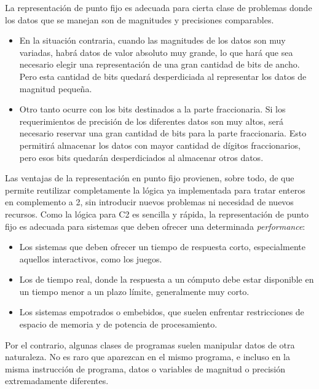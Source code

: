 \documentclass[spanish,A4,]{article}
\begin{document}
La representación de punto fijo es adecuada para cierta clase de
problemas donde los datos que se manejan son de magnitudes y precisiones
comparables.

\begin{itemize}
\itemsep1pt\parskip0pt
\item
  En la situación contraria, cuando las magnitudes de los datos son muy
  variadas, habrá datos de valor absoluto muy grande, lo que hará que
  sea necesario elegir una representación de una gran cantidad de bits
  de ancho. Pero esta cantidad de bits quedará desperdiciada al
  representar los datos de magnitud pequeña.\\
\item
  Otro tanto ocurre con los bits destinados a la parte fraccionaria. Si
  los requerimientos de precisión de los diferentes datos son muy altos,
  será necesario reservar una gran cantidad de bits para la parte
  fraccionaria. Esto permitirá almacenar los datos con mayor cantidad de
  dígitos fraccionarios, pero esos bits quedarán desperdiciados al
  almacenar otros datos.
\end{itemize}

Las ventajas de la representación en punto fijo provienen, sobre todo,
de que permite reutilizar completamente la lógica ya implementada para
tratar enteros en complemento a 2, sin introducir nuevos problemas ni
necesidad de nuevos recursos. Como la lógica para C2 es sencilla y
rápida, la representación de punto fijo es adecuada para sistemas que
deben ofrecer una determinada \emph{performance}:

\begin{itemize}
\itemsep1pt\parskip0pt
\item
  Los sistemas que deben ofrecer un tiempo de respuesta corto,
  especialmente aquellos interactivos, como los juegos.
\item
  Los de tiempo real, donde la respuesta a un cómputo debe estar
  disponible en un tiempo menor a un plazo límite, generalmente muy
  corto.
\item
  Los sistemas empotrados o embebidos, que suelen enfrentar
  restricciones de espacio de memoria y de potencia de procesamiento.
\end{itemize}

Por el contrario, algunas clases de programas suelen manipular datos de
otra naturaleza. No es raro que aparezcan en el mismo programa, e
incluso en la misma instrucción de programa, datos o variables de
magnitud o precisión extremadamente diferentes.
\end{document}
